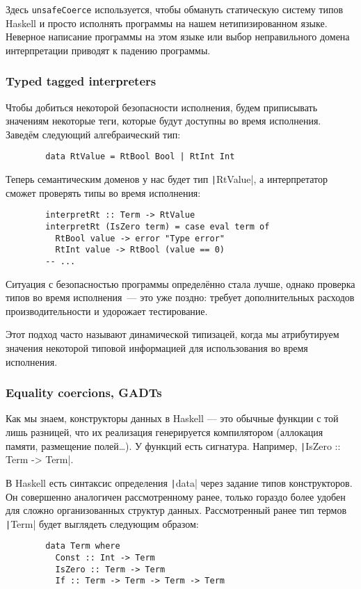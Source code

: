 \documentclass[12pt]{article}
\begin{document}
    Здесь \texttt{unsafeCoerce} используется, чтобы обмануть статическую систему типов Haskell и просто исполнять программы на нашем нетипизированном языке.
    Неверное написание программы на этом языке или выбор неправильного домена интерпретации приводят к падению программы.

    \subsubsection{Typed tagged interpreters}

    Чтобы добиться некоторой безопасности исполнения, будем приписывать значениям некоторые теги, которые будут доступны во время исполнения.
    Заведём следующий алгебраический тип:
    \begin{verbatim}
        data RtValue = RtBool Bool | RtInt Int
    \end{verbatim}

    Теперь семантическим доменов у нас будет тип \texttt|RtValue|, а интерпретатор сможет проверять типы во время исполнения:
    \begin{verbatim}
        interpretRt :: Term -> RtValue
        interpretRt (IsZero term) = case eval term of
          RtBool value -> error "Type error"
          RtInt value -> RtBool (value == 0)
        -- ...
    \end{verbatim}

    Ситуация с безопасностью программы определённо стала лучше, однако проверка типов во время исполнения~--- это уже поздно: требует дополнительных расходов производительности и удорожает тестирование.

    Этот подход часто называют динамической типизацей, когда мы атрибутируем значения некоторой типовой информацией для использования во время исполнения.

    \subsubsection{Equality coercions, GADTs}

    Как мы знаем, конструкторы данных в Haskell --- это обычные функции с той лишь разницей, что их реализация генерируется компилятором (аллокация памяти, размещение полей\ldots).
    У функций есть сигнатура.
    Например, \texttt|IsZero :: Term -> Term|.

    В Haskell есть синтаксис определения \texttt|data| через задание типов конструкторов.
    Он совершенно аналогичен рассмотренному ранее, только гораздо более удобен для сложно организованных структур данных.
    Рассмотренный ранее тип термов \texttt|Term| будет выглядеть следующим образом:
    \begin{verbatim}
        data Term where
          Const :: Int -> Term
          IsZero :: Term -> Term
          If :: Term -> Term -> Term -> Term
    \end{verbatim}
\end{document}
